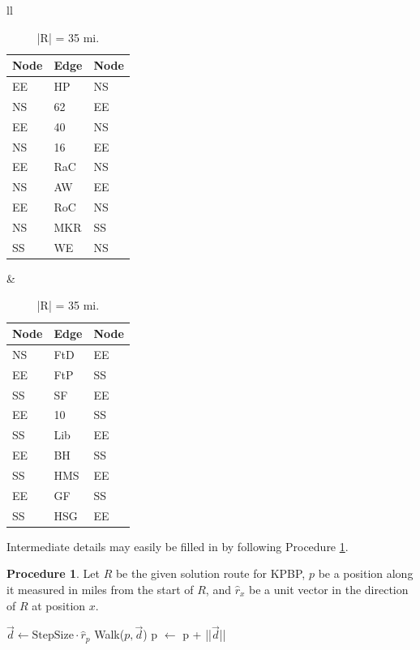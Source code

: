 \documentclass[twocolumn]{article}
\theoremstyle{plain}  %
\theoremstyle{definition}  %
\newtheorem{proc}{Procedure}
\theoremstyle{remark}  %
\begin{document}
\begin{table}[b]
	\centering
	\small
	\begin{tabular}{ll}
	\begin{tabular}{|l|l|l|}
		\hline
		Node & Edge & Node \\
		\hline
		EE & HP & NS \\
		NS & 62 & EE \\
		EE & 40 & NS \\
		NS & 16 & EE \\
		EE & RaC & NS \\
		NS & AW & EE \\
		EE & RoC & NS \\
		NS & MKR & SS \\
		SS & WE & NS \\
		\hline
	\end{tabular}
	&
	\begin{tabular}{|l|l|l|}
		\hline
		Node & Edge & Node \\
		\hline
		NS & FtD & EE \\
		EE & FtP & SS \\
		SS & SF & EE \\
		EE & 10 & SS \\
		SS & Lib & EE \\
		EE & BH & SS \\
		SS & HMS & EE \\
		EE & GF & SS \\
		SS & HSG & EE \\
		\hline
	\end{tabular}
	\end{tabular}
	\caption{|R| = 35 mi.}
	\label{tab:solution}
\end{table}

Intermediate details may easily be filled in by following Procedure \ref{Proc-Walk}.

\begin{proc} \label{Proc-Walk}
Let $R$ be the given solution route for KPBP, $p$ be a position along it measured in miles from the start of $R$, and $\hat{r}_x$ be a unit vector in the direction of $R$ at position $x$.
\end{proc}


\begin{algorithmic}
    \State $\vec{d} \gets \mathrm{StepSize} \cdot \hat{r}_p$
    \State Walk($p, \vec{d}$)
    \State p $\gets$ p + ||$\vec{d}$||
\EndWhile
\end{algorithmic}
\end{document}
